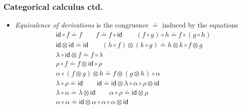\documentclass[10pt,t]{beamer}
\newcommand{\ot}{\otimes}
\newcommand{\al}{\alpha}
\newcommand{\lam}{\lambda}
\newcommand{\id}{\mathsf{id}}
\newcommand{\comp}{\circ}
\begin{document}
\begin{frame}

\frametitle{Categorical calculus ctd.}

\begin{itemize}

\item \emph{Equivalence of derivations} is the congruence $\doteq$
  induced by the equations
\[
\begin{array}{c}
\id \comp f \doteq f
\qquad
f \doteq f \comp \id
\qquad
(f \comp g) \comp h \doteq f \comp (g \comp h)
\\[6pt]
\id \ot \id \doteq \id
\qquad 
(h \comp f) \ot (k \comp g) \doteq h \ot k \comp f \ot g
\\[6pt]
\lam \comp \id \ot f \doteq f \comp \lam
\\
\rho \comp f \doteq f \ot \id \comp \rho
\\
\al \comp (f \ot g) \ot h \doteq f \ot (g \ot h) \comp \al
\\[6pt]
\lam \comp \rho \doteq \id
\qquad
\id \doteq \id \ot \lam \comp \al \comp \rho \ot \id
\\
\lam \comp \al \doteq \lam \ot \id
\qquad
\al \comp \rho \doteq \id \ot \rho
\\
\al \comp \al \doteq \id \ot \al \comp \al \comp \al \ot \id 
\end{array}
\]

\end{itemize}

\end{frame}
\end{document}
